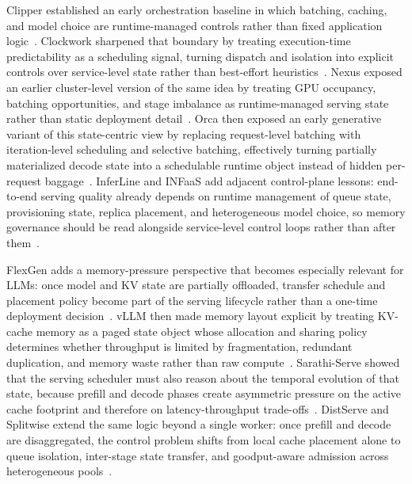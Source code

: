 \documentclass[acmsmall,screen,review]{acmart}
\begin{document}
Clipper established an early orchestration baseline in which batching, caching, and model choice are runtime-managed controls rather than fixed application logic~\cite{crankshaw2017clipper}. Clockwork sharpened that boundary by treating execution-time predictability as a scheduling signal, turning dispatch and isolation into explicit controls over service-level state rather than best-effort heuristics~\cite{gujarati2020clockwork}. Nexus exposed an earlier cluster-level version of the same idea by treating GPU occupancy, batching opportunities, and stage imbalance as runtime-managed serving state rather than static deployment detail~\cite{shen2019nexus}. Orca then exposed an early generative variant of this state-centric view by replacing request-level batching with iteration-level scheduling and selective batching, effectively turning partially materialized decode state into a schedulable runtime object instead of hidden per-request baggage~\cite{yu2022orca}. InferLine and INFaaS add adjacent control-plane lessons: end-to-end serving quality already depends on runtime management of queue state, provisioning state, replica placement, and heterogeneous model choice, so memory governance should be read alongside service-level control loops rather than after them~\cite{crankshaw2020inferline,romero2021infaas}.

FlexGen adds a memory-pressure perspective that becomes especially relevant for LLMs: once model and KV state are partially offloaded, transfer schedule and placement policy become part of the serving lifecycle rather than a one-time deployment decision~\cite{sheng2023flexgen}. vLLM then made memory layout explicit by treating KV-cache memory as a paged state object whose allocation and sharing policy determines whether throughput is limited by fragmentation, redundant duplication, and memory waste rather than raw compute~\cite{kwon2023pagedattention}. Sarathi-Serve showed that the serving scheduler must also reason about the temporal evolution of that state, because prefill and decode phases create asymmetric pressure on the active cache footprint and therefore on latency-throughput trade-offs~\cite{agrawal2024sarathi}. DistServe and Splitwise extend the same logic beyond a single worker: once prefill and decode are disaggregated, the control problem shifts from local cache placement alone to queue isolation, inter-stage state transfer, and goodput-aware admission across heterogeneous pools~\cite{zhong2024distserve,patel2024splitwise}.
\end{document}
